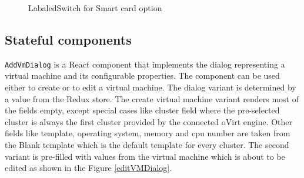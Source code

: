 \begin{figure}[h]
\caption{LabaledSwitch for Smart card option}
\label{switch}
\end{figure}

\subsection{Stateful components}
\texttt{AddVmDialog} is a React component that implements the dialog representing a virtual machine and its configurable properties. The component can be used either to create or to edit a virtual machine. The dialog variant is determined by a value from the Redux store. The create virtual machine variant renders most of the fields empty, except special cases like cluster field where the pre-selected cluster is always the first cluster provided by the connected oVirt engine. Other fields like template, operating system, memory and cpu number are taken from the Blank template which is the default template for every cluster. The second variant is pre-filled with values from the virtual machine which is about to be edited as shown in the Figure \ref{editVMDialog}.

